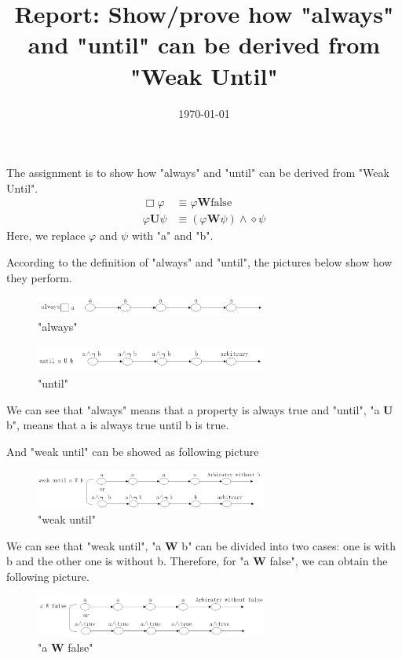 \documentclass[10pt, conference]{IEEEtran}
\begin{document}
    \title{Report: Show/prove how "always" and "until" can be derived from "Weak Until"}
    \author{}
    \date{\today}
    \maketitle
    
    The assignment is to show how "always" and "until" can be derived from "Weak Until".
    \begin{align*}
      \Box\varphi &\equiv \varphi\textbf{W}\text{false} \\
      \varphi\textbf{U}\psi & \equiv(\varphi\textbf{W}\psi)\wedge\diamond\psi
    \end{align*}
    Here, we replace $\varphi$ and $\psi$ with "a" and "b".

    According to the definition of "always" and "until", the pictures below show how they perform.
    \begin{figure}[H]
      \centering
      \includegraphics[width=3.0in]{3.png}
      \caption{"always"}
    \end{figure}
    \begin{figure}[H]
      \centering
      \includegraphics[width=3.0in]{1.png}
      \caption{"until"}
    \end{figure}

    We can see that "always" means that a property is always true and "until", "a {\textbf U} b", means that a is always true until b is true.

    And "weak until" can be showed as following picture
    \begin{figure}[H]
      \centering
      \includegraphics[width=3.0in]{4.png}
      \caption{"weak until"}
    \end{figure}
    
    We can see that "weak until", "a \textbf{W} b" can be divided into two cases: one is with b and the other one is without b.
    Therefore, for "a \textbf{W} false", we can obtain the following picture.
    \begin{figure}[H]
      \centering
      \includegraphics[width=3.0in]{5.png}
      \caption{"a \textbf{W} false"}
    \end{figure}
    
\end{document}
